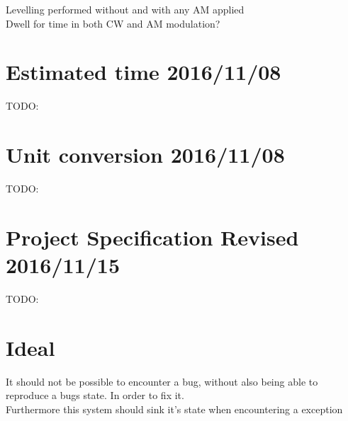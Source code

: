 Levelling performed without and with any AM applied\\
Dwell for time in both CW and AM modulation?\\

\section{Estimated time 2016/11/08}
TODO:

\section{Unit conversion 2016/11/08}
TODO:

\section{Project Specification Revised 2016/11/15}
TODO:

\section{Ideal}
It should not be possible to encounter a bug, without also being able to reproduce a bugs state. In order to fix it.\\
Furthermore this system should sink it's state when encountering a exception\\
